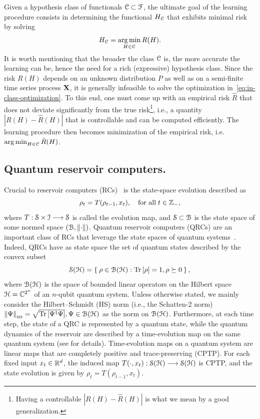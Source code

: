 Given a hypothesis class of functionals ${\mathcal{C}} \subset {\mathcal{F}}$, the ultimate goal of the learning procedure consists in determining the functional $H_{\mathcal{C}}$ that exhibits minimal risk by solving
\begin{equation}\label{eq:in-class-optimization}
    H_{\mathcal{C}} = \operatorname*{arg\,min}_{H \in {\mathcal{C}}} R(H).
\end{equation}
It is worth mentioning that the broader the class ${\mathcal{C}}$ is, the more accurate the learning can be, hence the need for a rich (expressive) hypothesis class. Since the risk $R(H)$ depends on an unknown distribution $P$ as well as on a semi-finite time series process ${\mathbf{X}}$, it is generally infeasible to solve the optimization in~\cref{eq:in-class-optimization}. To this end, one must come up with an empirical risk $\hat{R}$ that does not deviate significantly from the true risk\footnote{Having a controllable $|R(H) - \hat{R}(H)|$ is what we mean by a good generalization.}, i.e., a quantity $|R(H) - \hat{R}(H)|$ that is controllable and can be computed efficiently. The learning procedure then becomes minimization of the empirical risk, i.e.\ $\operatorname*{arg\,min}_{H \in {\mathcal{C}}} \hat{R}(H)$.


\subsection{Quantum reservoir computers.}\label{subsec:qrc-background}

Crucial to reservoir computers (RCs)~\cite{Jaeger_2001_EchoState_GMD148} is the state-space evolution described as 
\begin{equation}\label{eq:RC-evolution}
    \rho_t = T(\rho_{t-1}, x_t), \quad \text{for all} \; t \in {\mathbb{Z}}_-,
\end{equation}
where $T: {\mathcal{S}} \times {\mathcal{I}} \longrightarrow {\mathcal{S}}$ is called the evolution map, and ${\mathcal{S}} \subset {\mathcal{B}}$ is the state space of some normed space $({\mathcal{B}}, \left\lVert\cdot\right\rVert)$. Quantum reservoir computers (QRCs) are an important class of RCs that leverage the state spaces of quantum systems~\cite{Chen_Nurdin_Yamamoto_2020}. Indeed, QRCs have as state space the set of quantum states described by the convex subset
\begin{equation}
    {\mathcal{S}}({\mathcal{H}}) = \Set{\rho \in {\mathcal{B}}({\mathcal{H}}): \operatorname{Tr}\left[\rho\right] = 1, \rho \succeq 0},
\end{equation}
where ${\mathcal{B}}({\mathcal{H}})$ is the space of bounded linear operators on the Hilbert space ${\mathcal{H}} = {\mathbb{C}}^{2^n}$ of an $n$-qubit quantum system. Unless otherwise stated, we mainly consider the Hilbert--Schmidt (HS) norm (i.e., the Schatten-2 norm) $\left\lVert\Psi\right\rVert_{\scriptscriptstyle \rm HS} = \sqrt{\operatorname{Tr}\left[\Psi^\dag \Psi\right]}, \Psi \in {\mathcal{B}}({\mathcal{H}})$ as the norm on ${\mathcal{B}}({\mathcal{H}})$. Furthermore, at each time step, the state of a QRC is represented by a quantum state, while the quantum dynamics of the reservoir are described by a time-evolution map on the same quantum system (see \cite{Hayashi_Ishizaka_Kawachi_Kimura_Ogawa_2015} for details). Time-evolution maps on a quantum system are linear maps that are completely positive and trace-preserving (CPTP). For each fixed input $x_t \in {\mathbb{R}}^{d}$, the induced map $T(\cdot, x_t): {\mathcal{S}}({\mathcal{H}}) \longrightarrow {\mathcal{S}}({\mathcal{H}})$ is CPTP, and the state evolution is given by $\rho_t = T(\rho_{t-1}, x_t)$.



